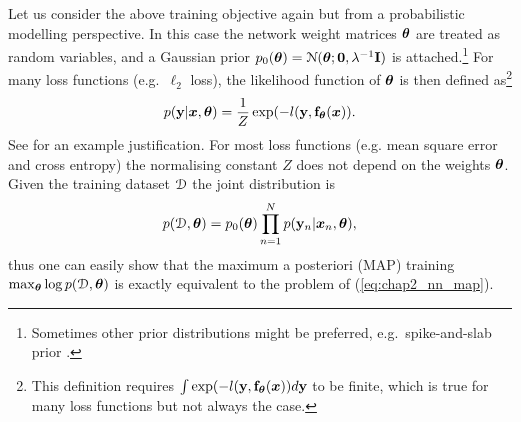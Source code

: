 Let us consider the above training objective again but from a probabilistic modelling perspective. In this case the network weight matrices $\bm{\theta}$ are treated as random variables, and a Gaussian prior $p_0(\bm{\theta}) = \mathcal{N}(\bm{\theta}; \bm{0}, \lambda^{-1} \mathbf{I})$ is attached.\footnote{Sometimes other prior distributions might be preferred, e.g.~spike-and-slab prior \citep{neal:thesis1995, louizos:bayesian_compression2017}.} For many loss functions (e.g.~$\ell_2$ loss), the likelihood function of $\bm{\theta}$ is then defined as\footnote{This definition requires $\int \exp( - l(\mathbf{y}, \mathbf{f}_{\bm{\theta}}(\bm{x})) d\mathbf{y}$ to be finite, which is true for many loss functions but not always the case.} 
$$ p(\mathbf{y} | \bm{x}, \bm{\theta}) = \frac{1}{Z} \exp( - l(\mathbf{y}, \mathbf{f}_{\bm{\theta}}(\bm{x})).$$
See \cite{lecun:energy2006} for an example justification. For most loss functions (e.g. mean square error and cross entropy) the normalising constant $Z$ does not depend on the weights $\bm{\theta}$. Given the training dataset $\mathcal{D}$ the joint distribution is 
$$ p(\mathcal{D}, \bm{\theta}) = p_0(\bm{\theta}) \prod_{n=1}^N p(\mathbf{y}_n | \bm{x}_n, \bm{\theta}),$$
thus one can easily show that the maximum a posteriori (MAP) training $\max_{\bm{\theta}} \log p(\mathcal{D}, \bm{\theta}) $ is exactly equivalent to the problem of (\ref{eq:chap2_nn_map}). 

